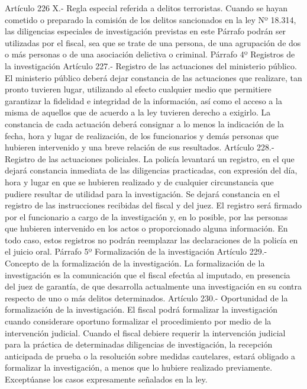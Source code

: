     Artículo 226 X.- Regla especial referida a delitos terroristas. Cuando se hayan cometido o preparado la comisión de los delitos sancionados en la ley Nº 18.314, las diligencias especiales de investigación previstas en este Párrafo podrán ser utilizadas por el fiscal, sea que se trate de una persona, de una agrupación de dos o más personas o de una asociación delictiva o criminal.
    Párrafo 4º Registros de la investigación
    Artículo 227.- Registro de las actuaciones del ministerio público. El ministerio público deberá dejar constancia de las actuaciones que realizare, tan pronto tuvieren lugar, utilizando al efecto cualquier medio que permitiere garantizar la fidelidad e integridad de la información, así como el acceso a la misma de aquellos que de acuerdo a la ley tuvieren derecho a exigirlo.
    La constancia de cada actuación deberá consignar a lo menos la indicación de la fecha, hora y lugar de realización, de los funcionarios y demás personas que hubieren intervenido y una breve relación de sus resultados.
    Artículo 228.- Registro de las actuaciones policiales. La policía levantará un registro, en el que dejará constancia inmediata de las diligencias practicadas, con expresión del día, hora y lugar en que se hubieren realizado y de cualquier circunstancia que pudiere resultar de utilidad para la investigación. Se dejará constancia en el registro de las instrucciones recibidas del fiscal y del juez.
    El registro será firmado por el funcionario a cargo de la investigación y, en lo posible, por las personas que hubieren intervenido en los actos o proporcionado alguna información.
    En todo caso, estos registros no podrán reemplazar las declaraciones de la policía en el juicio oral.
    Párrafo 5º Formalización de la investigación
    Artículo 229.- Concepto de la formalización de la investigación. La formalización de la investigación es la comunicación que el fiscal efectúa al imputado, en presencia del juez de garantía, de que desarrolla actualmente una investigación en su contra respecto de uno o más delitos determinados.
    Artículo 230.- Oportunidad de la formalización de la investigación. El fiscal podrá formalizar la investigación cuando considerare oportuno formalizar el procedimiento por medio de la intervención judicial.
    Cuando el fiscal debiere requerir la intervención judicial para la práctica de determinadas diligencias de investigación, la recepción anticipada de prueba o la resolución sobre medidas cautelares, estará obligado a formalizar la investigación, a menos que lo hubiere realizado previamente. Exceptúanse los casos expresamente señalados en la ley.
